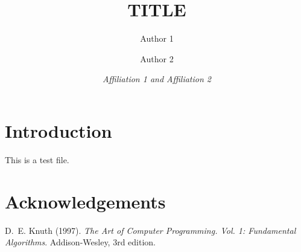 \documentclass[a4paper,11pt]{article}
\numberwithin{equation}{section}
\theoremstyle{plain}
\theoremstyle{definition}
\begin{document}
\title{\sc\bf\large\MakeUppercase{Title}}
\author{\sc Author 1 \and \sc Author 2}

\date{\itshape Affiliation 1 and Affiliation 2}

\maketitle

\section{Introduction}
This is a test file. 

\section*{Acknowledgements}





\setlength{\bibsep}{0.5ex}
\def\bibfont{\small}

%
%

\begin{thebibliography}{1}

D.~E. Knuth (1997).
\newblock \emph{The Art of Computer Programming. Vol. 1: Fundamental
  Algorithms}.
\newblock Addison-Wesley, 3rd edition.

\end{thebibliography}
\end{document}
